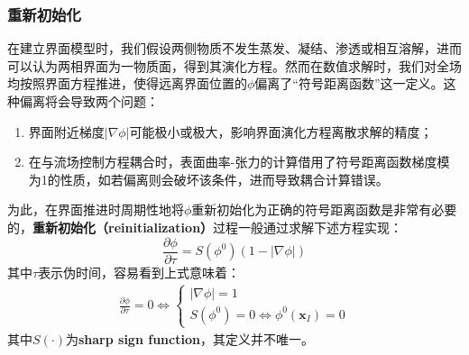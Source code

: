 \documentclass[11pt]{article}
\begin{document}
\subsubsection{重新初始化}
在建立界面模型时，我们假设两侧物质不发生蒸发、凝结、渗透或相互溶解，进而可以认为两相界面为一物质面，得到其演化方程。然而在数值求解时，我们对全场均按照界面方程推进，使得远离界面位置的$\phi$偏离了“符号距离函数”这一定义。这种偏离将会导致两个问题\citep{prosperetti_computational_2009}：
\begin{enumerate}
    \item 界面附近梯度$|\nabla\phi|$可能极小或极大，影响界面演化方程离散求解的精度；
    \item 在与流场控制方程耦合时，表面曲率-张力的计算借用了符号距离函数梯度模为1的性质，如若偏离则会破坏该条件，进而导致耦合计算错误。
\end{enumerate}
为此，在界面推进时周期性地将$\phi$重新初始化为正确的符号距离函数是非常有必要的，\textbf{重新初始化（reinitialization）}过程一般通过求解下述方程实现：
\begin{equation}
    \frac{\partial \phi}{\partial \tau}=S(\phi^0)\left(1-|\nabla\phi|\right)
    \label{eqn:reinit}
\end{equation}
其中$\tau$表示伪时间，容易看到上式意味着：
\begin{eqnarray}
    \frac{\partial \phi}{\partial \tau}=0\Longleftrightarrow\left\{\begin{array}{l}
        |\nabla\phi|=1 \\
        S(\phi^0)=0\Longleftrightarrow\phi^0(\bm{x}_I)=0
    \end{array}\right.
\end{eqnarray}
其中$S(\cdot)$为\textbf{sharp sign function}，其定义并不唯一。
\end{document}
